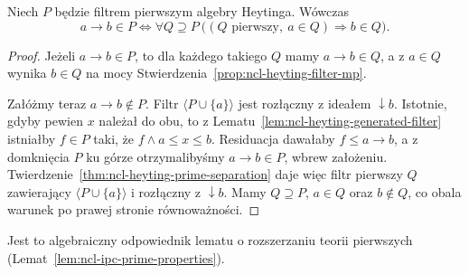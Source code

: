 \begin{lemat}
\label{lem:ncl-heyting-prime-implication}
Niech $P$ będzie filtrem pierwszym algebry Heytinga.
Wówczas
\[
 a\to b\in P
 \iff
 \forall Q\supseteq P\
 \bigl((Q\text{ pierwszy},\ a\in Q)\Longrightarrow b\in Q\bigr).
\]
\end{lemat}
\begin{proof}
Jeżeli $a\to b\in P$, to dla każdego takiego $Q$
mamy $a\to b\in Q$, a z $a\in Q$ wynika $b\in Q$
na mocy Stwierdzenia~\ref{prop:ncl-heyting-filter-mp}.

Załóżmy teraz $a\to b\notin P$.
Filtr $\langle P\cup\{a\}\rangle$ jest rozłączny
z ideałem $\downarrow b$.
Istotnie, gdyby pewien $x$ należał do obu,
to z Lematu~\ref{lem:ncl-heyting-generated-filter}
istniałby $f\in P$ taki, że $f\wedge a\leq x\leq b$.
Residuacja dawałaby $f\leq a\to b$, a z domknięcia
$P$ ku górze otrzymalibyśmy $a\to b\in P$,
wbrew założeniu.
Twierdzenie~\ref{thm:ncl-heyting-prime-separation}
daje więc filtr pierwszy $Q$ zawierający
$\langle P\cup\{a\}\rangle$ i rozłączny
z $\downarrow b$. Mamy $Q\supseteq P$,
$a\in Q$ oraz $b\notin Q$, co obala warunek
po prawej stronie równoważności.
\end{proof}
Jest to algebraiczny odpowiednik lematu
o rozszerzaniu teorii pierwszych
(Lemat~\ref{lem:ncl-ipc-prime-properties}).

